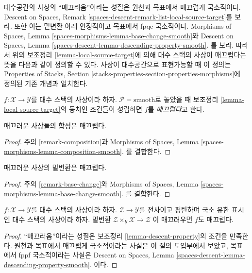 \noindent
대수공간의 사상의 ``매끄러움''이라는 성질은 원천과 목표에서 매끄럽게
국소적이다. Descent on Spaces, Remark
\ref{spaces-descent-remark-list-local-source-target}를 보라. 또한 이는
밑변환 아래 안정적이고 목표에서 fpqc 국소적이다. Morphisms of Spaces,
Lemma \ref{spaces-morphisms-lemma-base-change-smooth}와 Descent on Spaces,
Lemma
\ref{spaces-descent-lemma-descending-property-smooth}.
를 보라. 따라서 위의 보조정리 \ref{lemma-local-source-target}에 의해 대수
스택의 사상이 매끄럽다는 뜻을 다음과 같이 정의할 수 있다.%
사상이 대수공간으로 표현가능할 때 이 정의는 Properties of Stacks,
Section \ref{stacks-properties-section-properties-morphisms}에 정의된 기존
개념과 일치한다.

\begin{definition}
\label{definition-smooth}
$f : \mathcal{X} \to \mathcal{Y}$를 대수 스택의 사상이라 하자.
$\mathcal{P} = \text{smooth}$로 놓았을 때 보조정리
\ref{lemma-local-source-target}의 동치인 조건들이 성립하면 $f$를
{\it 매끄럽다}고 한다.
\end{definition}

\begin{lemma}
\label{lemma-composition-smooth}
매끄러운 사상들의 합성은 매끄럽다.
\end{lemma}

\begin{proof}
주의 \ref{remark-composition}과 Morphisms of Spaces, Lemma
\ref{spaces-morphisms-lemma-composition-smooth}.
를 결합한다.
\end{proof}

\begin{lemma}
\label{lemma-base-change-smooth}
매끄러운 사상의 밑변환은 매끄럽다.
\end{lemma}

\begin{proof}
주의 \ref{remark-base-change}와 Morphisms of Spaces, Lemma
\ref{spaces-morphisms-lemma-base-change-smooth}.
를 결합한다.
\end{proof}

\begin{lemma}
\label{lemma-descent-smooth}
$f : \mathcal{X} \to \mathcal{Y}$를 대수 스택의 사상이라 하자.
$\mathcal{Z} \to \mathcal{Y}$를 전사이고 평탄하며 국소 유한 표시인 대수
스택의 사상이라 하자. 밑변환
$\mathcal{Z} \times_\mathcal{Y} \mathcal{X} \to \mathcal{Z}$
이 매끄러우면 $f$도 매끄럽다.
\end{lemma}

\begin{proof}
``매끄러움''이라는 성질은 보조정리 \ref{lemma-descent-property}의 조건을
만족한다. 원천과 목표에서 매끄럽게 국소적이라는 사실은 이 절의
도입부에서 보았고, 목표에서 fppf 국소적이라는 사실은 Descent on Spaces,
Lemma
\ref{spaces-descent-lemma-descending-property-smooth}.
이다.
\end{proof}

